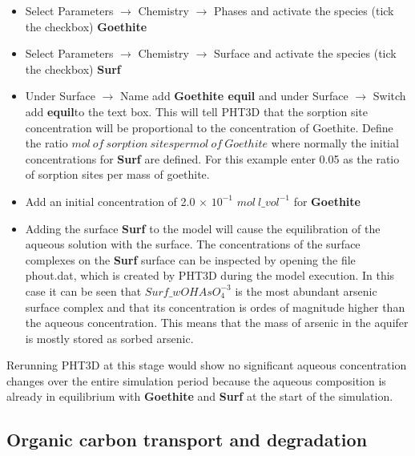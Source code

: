 \begin{itemize}

\item Select Parameters $\rightarrow$ Chemistry $\rightarrow$ Phases and 
activate the species (tick the checkbox) {\color{red} \textbf{Goethite}} 

\item Select Parameters $\rightarrow$ Chemistry $\rightarrow$ Surface and 
activate the species (tick the checkbox) {\color{red} \textbf{Surf}} 



\item Under Surface $\rightarrow$ Name {\color{red} add \textbf{Goethite equil}} and under Surface $\rightarrow$ Switch {\color{red} add \textbf{equil}}to the text box. This will tell PHT3D that the sorption site concentration will be proportional to the concentration of Goethite. Define the ratio $mol\ of\ sorption\ sites per mol\ of\ Goethite$ where normally the initial concentrations for {\color{red} \textbf{Surf}} are defined.
For this example enter 0.05 as the ratio of sorption sites per mass of goethite. 

\item Add an initial concentration of 2.0 $\times$ $10^{-1}$ $mol\ l\_{vol}^{-1}$ for {\color{red} \textbf{Goethite}} 

\item Adding the surface {\color{red} \textbf{Surf}} to the model will cause the equilibration of the aqueous solution with the surface. The concentrations of the surface complexes on the {\color{red} \textbf{Surf}} surface can be inspected by opening the file phout.dat, which is created by PHT3D during the model execution. In this case it can be seen that $Surf\_wOHAsO_4^{-3}$ is the most abundant arsenic surface complex and that its concentration is ordes of magnitude higher than the aqueous concentration. This means that the mass of arsenic in the aquifer is mostly stored as sorbed arsenic.  

\end{itemize}

Rerunning PHT3D at this stage would show no significant aqueous concentration changes over the entire simulation period because the aqueous composition is already in equilibrium with {\color{red} \textbf{Goethite}} and {\color{red} \textbf{Surf}} at the start of the simulation.

\subsection[Organic carbon transport and degradation]{Organic carbon transport and degradation} 

